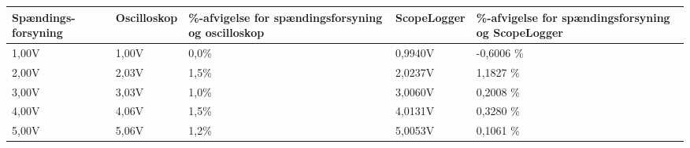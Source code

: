 \begin{center}
\label{USBisolatortest}
    \begin{tabular}{ | p{2cm} | p{2cm} | p{3.2cm} | p{2.4cm} | p{3.5cm} |}
    \hline
    \textbf{Spændings- forsyning} 	&  \textbf{Oscilloskop} 	& \textbf{\%-afvigelse for spændingsforsyning og oscilloskop}	& \textbf{ScopeLogger}	&\textbf{\%-afvigelse for spændingsforsyning og ScopeLogger} \\ \hline
    1,00V             				& 1,00V    				& 0,0\% 		    	& 0,9940V       &  -0,6006 \%  \\ \hline
    2,00V                          	& 2,03V					& 1,5\%			& 2,0237V       &   1,1827 \%  \\ \hline
    3,00V                         	& 3,03V					& 1,0\%	    		& 3,0060V       &   0,2008 \%   \\ \hline
    4,00V                          	& 4,06V					& 1,5\%			& 4,0131V       &   0,3280 \%   \\ \hline
    5,00V                          	& 5,06V					& 1,2\% 		& 5,0053V       &   0,1061 \%  \\ \hline
    \end{tabular}
\end{center}
